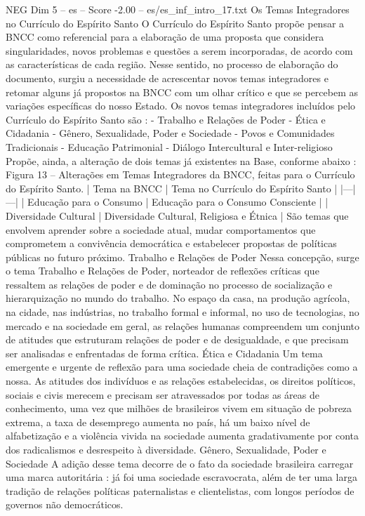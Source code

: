 \begin{textsample}{NEG Dim 5 – es – Score -2.00 – es/es\_inf\_intro\_17.txt}  \label{ex:f5_neg_182}
Os Temas Integradores no Currículo do Espírito Santo O Currículo do Espírito Santo propõe pensar a BNCC como referencial para a elaboração de uma proposta que considera singularidades, novos problemas e questões a serem incorporadas, de acordo com as características de cada região.
Nesse sentido, no processo de elaboração do documento, surgiu a necessidade de acrescentar novos temas integradores e retomar alguns já propostos na BNCC com um olhar crítico e que se percebem as variações específicas do nosso Estado.
Os novos temas integradores incluídos pelo Currículo do Espírito Santo são : - Trabalho e Relações de Poder - Ética e Cidadania - Gênero, Sexualidade, Poder e Sociedade - Povos e Comunidades Tradicionais - Educação Patrimonial - Diálogo Intercultural e Inter-religioso Propõe, ainda, a alteração de dois temas já existentes na Base, conforme abaixo : Figura 13 – Alterações em Temas Integradores da BNCC, feitas para o Currículo do Espírito Santo. | Tema na BNCC | Tema no Currículo do Espírito Santo | |---|---| | Educação para o Consumo | Educação para o Consumo Consciente | | Diversidade Cultural | Diversidade Cultural, Religiosa e Étnica | São temas que envolvem aprender sobre a sociedade atual, mudar comportamentos que comprometem a convivência democrática e estabelecer propostas de políticas públicas no futuro próximo.
Trabalho e Relações de Poder Nessa concepção, surge o tema Trabalho e Relações de Poder, norteador de reflexões críticas que ressaltem as relações de poder e de dominação no processo de socialização e hierarquização no mundo do trabalho.
No espaço da casa, na produção agrícola, na cidade, nas indústrias, no trabalho formal e informal, no uso de tecnologias, no mercado e na sociedade em geral, as relações humanas compreendem um conjunto de atitudes que estruturam relações de poder e de desigualdade, e que precisam ser analisadas e enfrentadas de forma crítica.
Ética e Cidadania Um tema emergente e urgente de reflexão para uma sociedade cheia de contradições como a nossa.
As atitudes dos indivíduos e as relações estabelecidas, os direitos políticos, sociais e civis merecem e precisam ser atravessados por todas as áreas de conhecimento, uma vez que milhões de brasileiros vivem em situação de pobreza extrema, a taxa de desemprego aumenta no país, há um baixo nível de alfabetização e a violência vivida na sociedade aumenta gradativamente por conta dos radicalismos e desrespeito à diversidade.
Gênero, Sexualidade, Poder e Sociedade A adição desse tema decorre de o fato da sociedade brasileira carregar uma marca autoritária : já foi uma sociedade escravocrata, além de ter uma larga tradição de relações políticas paternalistas e clientelistas, com longos períodos de governos não democráticos.

\end{textsample}
